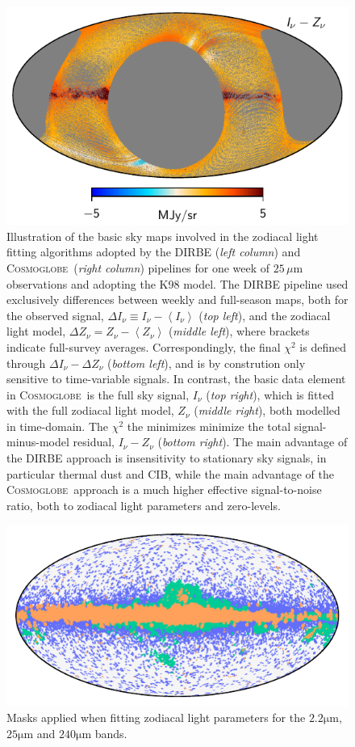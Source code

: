 \documentclass{aa}
\def\Cosmoglobe{\textsc{Cosmoglobe}}
\begin{document}
\begin{figure}
    \includegraphics[width=0.49\linewidth]{figs/map_06a_week.pdf}
    \caption{Illustration of the basic sky maps involved in the zodiacal 
    light fitting algorithms adopted by the DIRBE (\emph{left column}) 
    and \Cosmoglobe\ (\emph{right column}) pipelines for one week of 
    $25\,\mu\mathrm{m}$ observations and adopting the K98 model. The 
    DIRBE pipeline used exclusively differences between weekly and 
    full-season maps, both for the observed signal, 
    $\Delta I_{\nu} \equiv I_{\nu}-\left<I_{\nu}\right>$ (\emph{top left}), 
    and the zodiacal light model, 
    $\Delta Z_{\nu} = Z_{\nu}-\left<Z_{\nu}\right>$ (\emph{middle left}), 
    where brackets indicate full-survey averages. Correspondingly, the 
    final $\chi^2$ is defined through $\Delta I_{\nu} - \Delta Z_{\nu}$ 
    (\emph{bottom left}), and is by constrution only sensitive to 
    time-variable signals. In contrast, the basic data element in 
    \Cosmoglobe\ is the full sky signal, $I_{\nu}$ (\emph{top right}), 
    which is fitted with the full zodiacal light model, $Z_{\nu}$ 
    (\emph{middle right}), both modelled in time-domain. The $\chi^2$ 
    the minimizes minimize the total signal-minus-model residual, 
    $I_{\nu}-Z_{\nu}$ (\emph{bottom right}). The main advantage of the 
    DIRBE approach is insensitivity to stationary sky signals, in 
    particular thermal dust and CIB, while the main advantage of the 
    \Cosmoglobe\ approach is a much higher effective signal-to-noise 
    ratio, both to zodiacal light parameters and zero-levels.}
    \label{fig:week_vs_full}
\end{figure}
\begin{figure}
    \centering
    \includegraphics[width=\columnwidth]{figs/mask_zodi_fitting.pdf}
    \caption{Masks applied when fitting zodiacal light parameters for 
    the $2.2\mathrm{\mu m}$, $25\mathrm{\mu m}$ and $240\mathrm{\mu m}$ 
    bands.}
    \label{fig:masks}
\end{figure}
\end{document}

